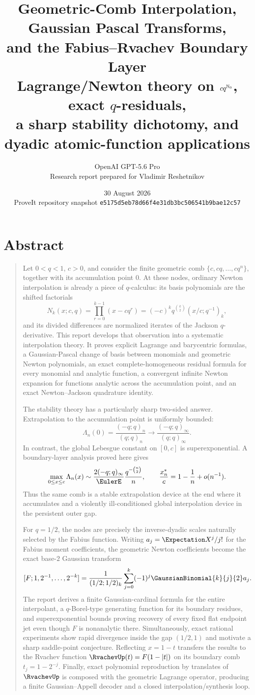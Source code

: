 \documentclass[11pt,oneside]{book}
\title{\bfseries Geometric-Comb Interpolation, Gaussian Pascal Transforms,\\[0.25em]
       and the Fabius--Rvachev Boundary Layer\\[0.6em]
       \Large Lagrange/Newton theory on $c q^{\mathbb N_0}$, exact $q$-residuals,\\
       a sharp stability dichotomy, and dyadic atomic-function applications}
\author{OpenAI GPT-5.6 Pro\\[0.4em]
\small Research report prepared for Vladimir Reshetnikov}
\date{30 August 2026\\[0.2em]
\small ProveIt repository snapshot \texttt{e5175d5eb78d66f4e31db3bc506541b9bae12c57}}
\numberwithin{equation}{chapter}
\theoremstyle{definition}
\theoremstyle{remark}
\newcommand{\twobinom}[2]{\GaussianBinomial{#1}{#2}{2}}
\newcommand{\Leb}{\Lambda}
\begin{document}
\frontmatter
\hypersetup{pageanchor=false}
\maketitle
\hypersetup{pageanchor=true}

\chapter*{Abstract}
\begin{quote}
Let $0<q<1$, $c>0$, and consider the finite geometric comb
$\{c,cq,\ldots,cq^n\}$, together with its accumulation point $0$.
At these nodes, ordinary Newton interpolation is already a piece of
$q$-calculus: its basis polynomials are the shifted factorials
\[
 N_k(x;c,q)=\prod_{r=0}^{k-1}(x-cq^r)
 =(-c)^kq^{\binom k2}(x/c;q^{-1})_k,
\]
and its divided differences are normalized iterates of the Jackson
$q$-derivative.  This report develops that observation into a systematic
interpolation theory.  It proves explicit Lagrange and barycentric formulas,
a Gaussian-Pascal change of basis between monomials and geometric Newton
polynomials, an exact complete-homogeneous residual formula for every
monomial and analytic function, a convergent infinite Newton expansion for
functions analytic across the accumulation point, and an exact
Newton--Jackson quadrature identity.

The stability theory has a particularly sharp two-sided answer.  Extrapolation
to the accumulation point is uniformly bounded:
\[
 \Leb_n(0)=\frac{(-q;q)_n}{(q;q)_n}
 \longrightarrow\frac{(-q;q)_\infty}{(q;q)_\infty}.
\]
In contrast, the global Lebesgue constant on $[0,c]$ is
superexponential.  A boundary-layer analysis proved here gives
\[
 \max_{0\le x\le c}\Leb_n(x)
 \sim \frac{2(-q;q)_\infty}{\EulerE}
       \frac{q^{-\binom n2}}{n},
 \qquad
 \frac{x_n^*}{c}=1-\frac1n+o(n^{-1}).
\]
Thus the same comb is a stable extrapolation device at the end where it
accumulates and a violently ill-conditioned global interpolation device in
the persistent outer gap.

For $q=1/2$, the nodes are precisely the inverse-dyadic scales naturally
selected by the Fabius function.  Writing $a_j=\Expectation X^j/j!$ for the Fabius
moment coefficients, the geometric Newton coefficients become the exact
base-$2$ Gaussian transform
\[
 [F;1,2^{-1},\ldots,2^{-k}]
 =\frac1{(1/2;1/2)_k}
   \sum_{j=0}^k(-1)^j\twobinom{k}{j}a_j.
\]
The report derives a finite Gaussian-cardinal formula for the entire
interpolant, a $q$-Borel-type generating function for its boundary residues,
and superexponential bounds proving recovery of every fixed flat endpoint
jet even though $F$ is nonanalytic there.  Simultaneously, exact rational
experiments show rapid divergence inside the gap $(1/2,1)$ and motivate a
sharp saddle-point conjecture.  Reflecting $x=1-t$ transfers the results to
the Rvachev function $\RvachevUp(t)=F(1-|t|)$ on its boundary comb
$t_j=1-2^{-j}$.  Finally, exact polynomial reproduction by translates of
$\RvachevUp$ is composed with the geometric Lagrange operator, producing a finite
Gaussian--Appell decoder and a closed interpolation/synthesis loop.


\end{quote}
\end{document}
